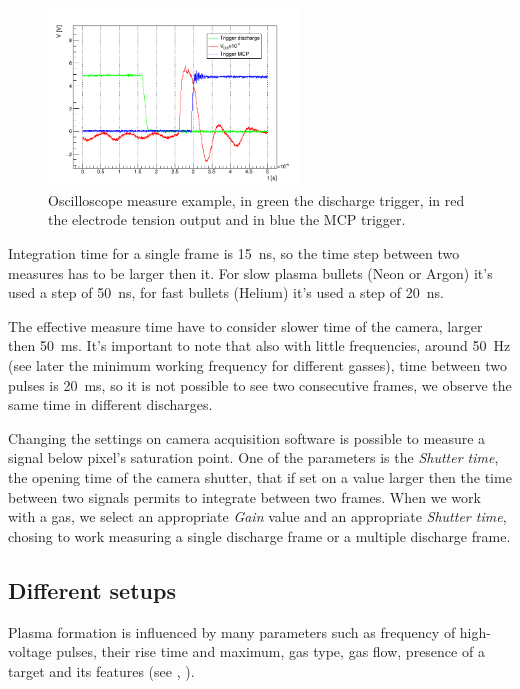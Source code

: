 \begin{figure}
 \centering
 \includegraphics[width=0.6\textwidth]{Images/Shape/times_osc.png}
 \caption{Oscilloscope measure example, in green the discharge trigger, in red the electrode tension output and in blue the MCP trigger.}
 \label{fig:times_signals}
\end{figure}


Integration time for a single frame is \SI{15}{\nano\second}, so the time step between two measures has to be larger then it. For slow plasma bullets (Neon or Argon) it's used a step of \SI{50}{\nano\second}, for fast bullets (Helium) it's used a step of \SI{20}{\nano\second}.


The effective measure time have to consider slower time of the camera, larger then \SI{50}{\milli\second}. It's important to note that also with little frequencies, around \SI{50}{\hertz} (see later the minimum working frequency for different gasses), time between two pulses is \SI{20}{\milli\second}, so it is not possible to see two consecutive frames, we observe the same time in different discharges.

Changing the settings on camera acquisition software is possible to measure a signal below pixel's saturation point. One of the parameters is the \emph{Shutter time}, the opening time of the camera shutter, that if set on a value larger then the time between two signals permits to integrate between two frames.
When we work with a gas, we select an appropriate \emph{Gain} value and an appropriate \emph{Shutter time}, chosing to work measuring a single discharge frame or a multiple discharge frame.

\subsection{Different setups}
Plasma formation is influenced by many parameters such as frequency of high-voltage pulses, their rise time and maximum, gas type, gas flow, presence of a target and its features (see \cite{Mericam_Bourdet_2009}, \cite{Jarrige_2010}).


